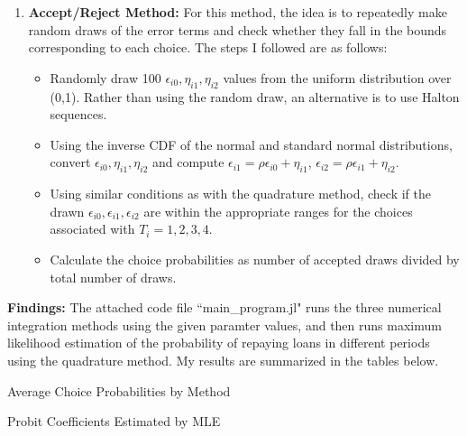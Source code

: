 \documentclass[12pt]{article}
\begin{document}
\begin{enumerate}
	\item \textbf{Accept/Reject Method: } For this method, the idea is to repeatedly make random draws of the error terms and check whether they fall in the bounds corresponding to each choice. The steps I followed are as follows:
		\begin{itemize}
			\item Randomly draw 100 $\epsilon_{i0}, \eta_{i1}, \eta_{i2}$ values from the uniform distribution over (0,1). Rather than using the random draw, an alternative is to use Halton sequences.
			\item Using the inverse CDF of the normal and standard normal distributions, convert $\epsilon_{i0}, \eta_{i1}, \eta_{i2}$ and compute $\epsilon_{i1} = \rho \epsilon_{i0} + \eta_{i1}$, $\epsilon_{i2} = \rho \epsilon_{i1} + \eta_{i2}$.
			\item Using similar conditions as with the quadrature method, check if the drawn $\epsilon_{i0}, \epsilon_{i1}, \epsilon_{i2}$ are within the appropriate ranges for the choices associated with $T_i = 1, 2, 3, 4$.
			\item Calculate the choice probabilities as number of accepted draws divided by total number of draws.	
		\end{itemize}
	\end{enumerate}

\noindent \textbf{Findings:} The attached code file ``main\_program.jl" runs the three numerical integration methods using the given paramter values, and then runs maximum likelihood estimation of the probability of repaying loans in different periods using the quadrature method. My results are summarized in the tables below. 




\begin{table}[!htbp]
\centering 
\caption{Average Choice Probabilities by Method}\label{tab_prob}

\end{table}

\begin{table}[!htbp]
	\centering 
	\caption{Probit Coefficients Estimated by MLE}\label{tab_mle}
	
\end{table}
\end{document}
